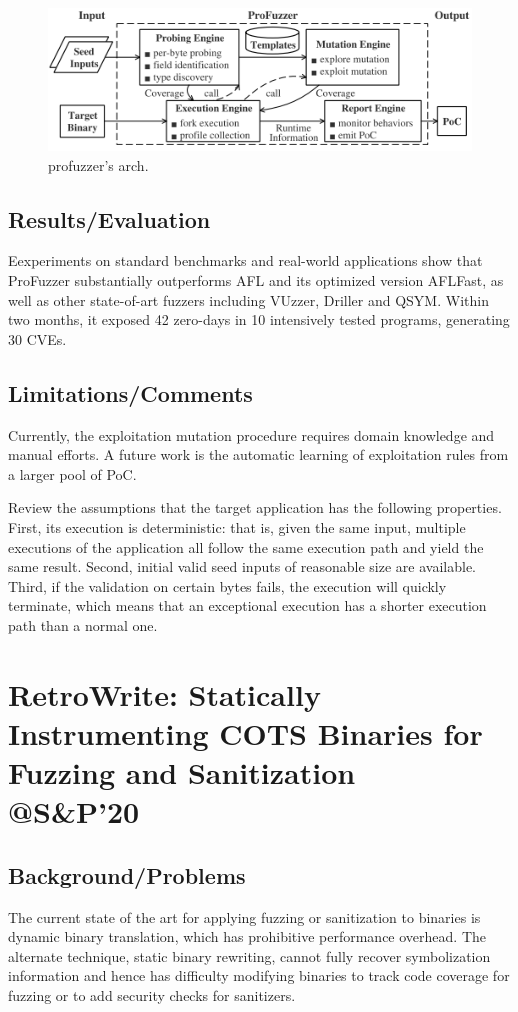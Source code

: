 \begin{figure}[h]
    \centering
    \includegraphics[width=\linewidth]{profuzzer.png} %
    \caption{profuzzer's arch.}	
    \label{fig:profuzzer}
\end{figure}
\subsection{Results/Evaluation}
Eexperiments on standard benchmarks and real-world applications show that ProFuzzer substantially outperforms AFL and its optimized version AFLFast, as well as other state-of-art fuzzers including VUzzer, Driller and QSYM. Within two months, it exposed 42 zero-days in 10 intensively tested programs, generating 30 CVEs.
\subsection{Limitations/Comments}
Currently, the exploitation mutation procedure requires domain knowledge and manual efforts.  A future work is the automatic learning of exploitation rules from a larger pool of PoC.

Review the assumptions that the target application has the following properties. First, its execution is deterministic: that is, given the same input, multiple executions of the application all follow the same execution path and yield the same result. Second, initial valid seed inputs of reasonable size are available. Third, if the validation on certain bytes fails, the execution will quickly terminate, which means that an exceptional execution has a shorter execution path than a normal one. 
\newpage
\section{RetroWrite: Statically Instrumenting COTS Binaries for Fuzzing and Sanitization \\@S\&P'20}
\subsection{Background/Problems}
The current state of the art for applying fuzzing or sanitization to binaries is dynamic binary translation, which has prohibitive performance overhead. The alternate technique, static binary rewriting, cannot fully recover symbolization information and hence has difficulty modifying binaries to track code coverage for fuzzing or to add security checks for sanitizers.

